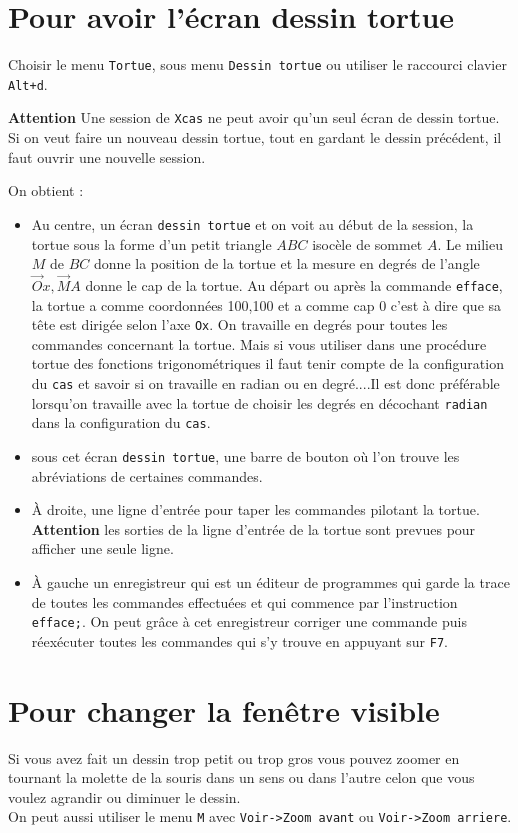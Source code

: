 \documentclass[a4paper,11pt]{book}
\begin{document}
\section{Pour avoir l'\'ecran dessin tortue}
Choisir le menu {\tt Tortue}, sous menu  {\tt Dessin tortue} ou
utiliser le raccourci clavier {\tt Alt+d}.

{\bf Attention} Une session de {\tt Xcas} ne peut avoir qu'un seul \'ecran de
dessin tortue. Si on veut faire un nouveau dessin tortue, tout en gardant le 
dessin pr\'ec\'edent, il faut ouvrir une nouvelle session.

On obtient :
\begin{itemize}
\item Au centre, un \'ecran {\tt dessin tortue} et on voit au d\'ebut de la 
session, la tortue sous la forme d'un petit triangle $ABC$ isoc\`ele de sommet 
$A$. Le milieu $M$ de $BC$ donne la 
position de la tortue et la mesure en degr\'es de l'angle 
$\overrightarrow Ox,\overrightarrow MA$ donne 
le cap  de la tortue. Au d\'epart ou apr\`es la commande {\tt efface}, la tortue
a comme coordonn\'ees 100,100 et a comme cap 0 c'est \`a dire que sa t\^ete est 
dirig\'ee selon l'axe {\tt Ox}. On travaille en degr\'es pour toutes les 
commandes concernant la tortue. 
Mais si vous utiliser dans une proc\'edure tortue des fonctions 
trigonom\'etriques il faut tenir compte de la configuration du {\tt cas} et 
savoir si on travaille en radian ou en degr\'e....Il est donc pr\'ef\'erable 
lorsqu'on travaille avec la tortue de
choisir les degr\'es en d\'ecochant {\tt radian} dans la configuration du 
{\tt cas}.
\item sous cet \'ecran {\tt dessin tortue}, une barre de bouton o\`u l'on 
trouve les abr\'eviations de certaines commandes.
\item  \`A  droite, une ligne d'entr\'ee pour taper les commandes pilotant la 
tortue.\\
{\bf Attention} les sorties de la  ligne d'entr\'ee de la tortue sont prevues 
pour afficher une seule ligne. 
\item  \`A gauche un enregistreur qui est un \'editeur de programmes qui garde 
la trace de toutes les commandes effectu\'ees et qui commence par l'instruction
{\tt efface;}. On peut gr\^ace \`a cet enregistreur corriger une commande puis 
r\'eex\'ecuter toutes les commandes qui s'y trouve en appuyant sur {\tt F7}.
\end{itemize}
\section{Pour changer la fen\^etre visible}
Si vous avez fait un dessin trop petit ou trop gros vous pouvez zoomer 
en tournant la molette de la souris dans un sens ou dans l'autre celon que vous
voulez agrandir ou diminuer le dessin.\\
On peut aussi utiliser le menu {\tt M} avec {\tt Voir->Zoom avant} ou 
{\tt Voir->Zoom arriere}.
\end{document}
